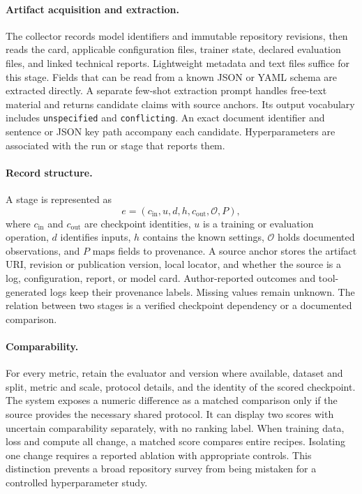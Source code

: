 \documentclass{article}
\newcommand{\field}[1]{\texttt{#1}}
\begin{document}
\paragraph{Artifact acquisition and extraction.}
The collector records model identifiers and immutable repository revisions, then reads the card, applicable configuration files, trainer state, declared evaluation files, and linked technical reports. Lightweight metadata and text files suffice for this stage. Fields that can be read from a known JSON or YAML schema are extracted directly. A separate few-shot extraction prompt handles free-text material and returns candidate claims with source anchors. Its output vocabulary includes \field{unspecified} and \field{conflicting}. An exact document identifier and sentence or JSON key path accompany each candidate. Hyperparameters are associated with the run or stage that reports them.

\paragraph{Record structure.}
A stage is represented as
\begin{equation}
e=(c_{\mathrm{in}}, u, d, h, c_{\mathrm{out}}, \mathcal{O}, P),
\label{eq:stage}
\end{equation}
where \(c_{\mathrm{in}}\) and \(c_{\mathrm{out}}\) are checkpoint identities, \(u\) is a training or evaluation operation, \(d\) identifies inputs, \(h\) contains the known settings, \(\mathcal{O}\) holds documented observations, and \(P\) maps fields to provenance. A source anchor stores the artifact URI, revision or publication version, local locator, and whether the source is a log, configuration, report, or model card. Author-reported outcomes and tool-generated logs keep their provenance labels. Missing values remain unknown. The relation between two stages is a verified checkpoint dependency or a documented comparison.

\paragraph{Comparability.}
For every metric, retain the evaluator and version where available, dataset and split, metric and scale, protocol details, and the identity of the scored checkpoint. The system exposes a numeric difference as a matched comparison only if the source provides the necessary shared protocol. It can display two scores with uncertain comparability separately, with no ranking label. When training data, loss and compute all change, a matched score compares entire recipes. Isolating one change requires a reported ablation with appropriate controls. This distinction prevents a broad repository survey from being mistaken for a controlled hyperparameter study.
\end{document}
